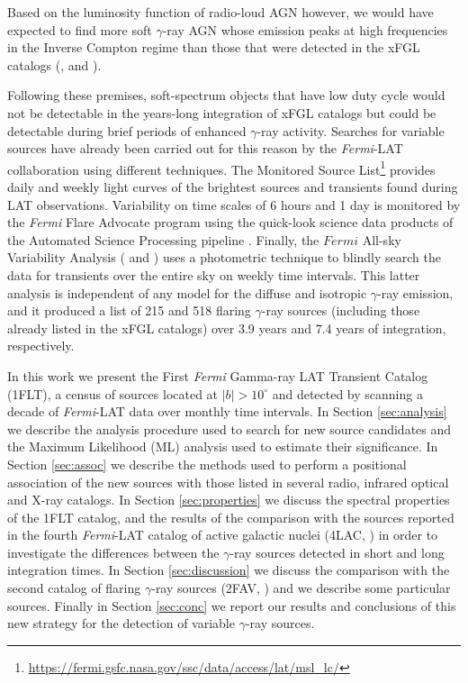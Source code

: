\documentclass{aastex62}
\newcommand\fermilat{{\it Fermi}-LAT }
\begin{document}
Based on the luminosity function of radio-loud AGN however, we would have expected to find more soft $\gamma$-ray AGN whose emission peaks at high frequencies in the Inverse Compton regime \citep{radiogamma} than those that were detected in the xFGL catalogs (\citealt{abdo2010firstLAC}, \citealt{ackermann2011secondLAC} and \citealt{ackermann20153LAC}).

Following these premises, soft-spectrum objects that have low duty cycle would not be detectable in the years-long integration of xFGL catalogs but could be detectable during brief periods of enhanced $\gamma$-ray activity. 
Searches for variable sources  have already been carried out for this reason by the \fermilat collaboration using different techniques. The Monitored Source List\footnote{\url{https://fermi.gsfc.nasa.gov/ssc/data/access/lat/msl_lc/}} provides daily and weekly light curves of the brightest sources and transients found during LAT observations. Variability on time scales of 6 hours and 1 day is monitored by the {\it Fermi} Flare Advocate program \citep{2012AIPC.1505..697Ciprini2012} using the quick-look science data products of the Automated Science Processing pipeline \citep{2012amld.book...41C}. Finally, the $Fermi$ All-sky Variability Analysis (\citealt{ackermann2013fermiFAVA} and \citealt{abdollahi2017second2FAV}) uses a photometric technique to  blindly search the data for transients over the entire sky on weekly time intervals. This latter analysis is independent of any model for the diffuse and isotropic $\gamma$-ray emission, and it produced a list of 215 and 518 flaring $\gamma$-ray sources (including those already listed in the xFGL catalogs) over 3.9 years and 7.4 years of integration, respectively.

In this work we present the  First {\it Fermi} Gamma-ray LAT Transient Catalog (1FLT), a census of sources located at $|b|>10^\circ$ and detected by scanning a decade of \fermilat data over monthly time intervals. 
In Section \ref{sec:analysis} we describe the analysis procedure used to search for new source candidates and the Maximum Likelihood (ML) analysis used to estimate their significance. In Section \ref{sec:assoc} we describe the methods used to perform a positional association of the new sources with those listed in several radio, infrared optical and X-ray catalogs. In Section \ref{sec:properties} we discuss the spectral properties of the 1FLT catalog, and the results of the comparison with the sources reported in the fourth \fermilat catalog of active galactic nuclei (4LAC, \citealt{20204LAC}) in order to investigate the differences between the $\gamma$-ray sources detected in short and long integration times. In Section \ref{sec:discussion} we discuss the comparison with the second catalog of flaring $\gamma$-ray sources (2FAV, \citealt{abdollahi2017second2FAV}) and we describe some particular sources. Finally in Section \ref{sec:conc} we report our results and conclusions of this new strategy for the detection of variable $\gamma$-ray sources.
\end{document}
